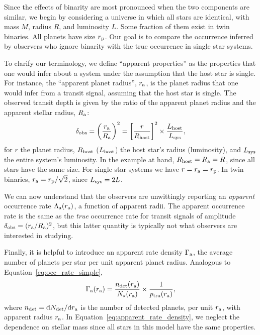 \documentclass[12pt,modern]{aastex61}
\renewcommand{\a}{_{\rm a}}
\newcommand{\p}{_{\rm p}}
\begin{document}
Since the effects of binarity are most pronounced when the two
components are similar, we begin by considering a universe in which
all stars are identical, with mass $M$, radius $R$, and luminosity
$L$.  Some fraction of them exist in twin binaries.  All planets have
size $r\p$.  Our goal is to compare the occurrence inferred by
observers who ignore binarity with the true occurrence in single star
systems.

To clarify our terminology, we define ``apparent properties'' as the
properties that one would infer about a system under the assumption
that the host star is single. For instance, the  ``apparent planet
radius'', $r\a$, is the planet radius that one would infer from a
transit signal, assuming that the host star is single.  The observed
transit depth is given by the ratio of the apparent planet radius and
the apparent stellar radius, $R\a$:
\begin{equation}
  \delta_{\rm obs}
  = \left(\frac{r\a}{R\a}\right)^2
  = \left[{r\over R_{\rm host}}\right]^2\times {L_{\rm host} \over
          L_{\rm sys}},
  \label{eq:delta_obs_general} 
\end{equation}
for $r$ the planet radius, $R_{\rm host}$ ($L_{\rm host}$) the host
star's radius (luminosity), and $L_{\rm sys}$ the entire system's
luminosity.  In the example at hand, $R_{\rm host} =R\a = R$, since
all stars have the same size. For single star systems we have
$r=r\a=r\p$. In twin binaries, $r\a=r\p/\sqrt{2}$, since $L_{\rm
sys}=2L$.

We can now understand that the observers are unwittingly reporting an
{\it apparent} occurrence rate $\Lambda\a(r\a)$, a function of
apparent radii.  The apparent occurrence rate is the same as the {\it
true} occurrence rate for transit signals of amplitude $\delta_{\rm
obs} = (r\a/R\a)^2$, but this latter quantity is typically not what
observers are interested in studying.

Finally, it is helpful to introduce an apparent rate density
$\Gamma\a$, the average number of planets per star per unit apparent
planet radius. Analogous to Equation~\ref{eq:occ_rate_simple},  
\begin{equation}
  \Gamma\a(r\a) = \frac{n_{\rm det}(r\a)}{N_\star(r\a)}
      \times \frac{1}{p_{\rm tra}(r\a)},
\label{eq:apparent_rate_density}
\end{equation}
where $n_{\rm det}={\rm d}N_{\rm det}/{\rm d}r\a$ is the number  of
detected planets, per unit $r\a$, with apparent radius $r\a$.  In
Equation~\ref{eq:apparent_rate_density}, we neglect the dependence on
stellar mass since all stars in this model have the same properties.
\end{document}
